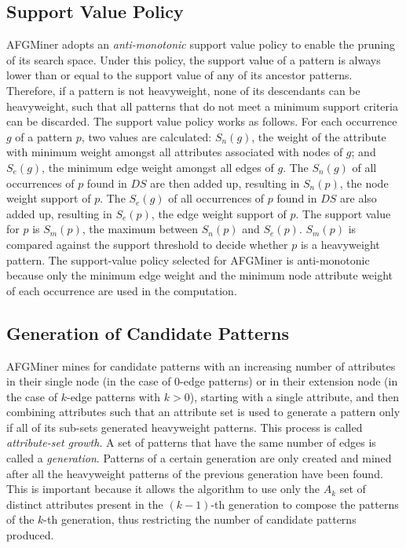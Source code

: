 \subsection{Support Value Policy}
AFGMiner adopts an \emph{anti-monotonic} support value policy to enable the pruning of its search space. Under this policy, the support value of a pattern is always lower than or equal to the support value of any of its ancestor patterns. Therefore, if a pattern is not heavyweight, none of its descendants can be heavyweight, such that all patterns that do not meet a minimum support criteria can be discarded. The support value policy works as follows. For each occurrence $g$ of a pattern $p$, two values are calculated: $S_n(g)$, the weight of the attribute with minimum weight amongst all attributes associated with nodes of $g$; and $S_e(g)$, the minimum edge weight amongst all edges of $g$. The $S_n(g)$ of all occurrences of $p$ found in $DS$ are then added up, resulting in $S_n(p)$, the node weight support of $p$. The $S_e(g)$ of all occurrences of $p$ found in $DS$ are also added up, resulting in $S_e(p)$, the edge weight support of $p$. The support value for $p$ is $S_m(p)$, the maximum between $S_n(p)$ and $S_e(p)$. $S_m(p)$ is compared against the support threshold to decide whether $p$ is a heavyweight pattern. The support-value policy selected for AFGMiner is anti-monotonic because only the minimum edge weight and the minimum node attribute weight of each occurrence are used in the computation.

\subsection{Generation of Candidate Patterns}
AFGMiner mines for candidate patterns with an increasing number of attributes in their single node (in the case of 0-edge patterns) or in their extension node (in the case of $k$-edge patterns with $k > 0$), starting with a single attribute, and then combining attributes such that an attribute set is used to generate a pattern only if all of its sub-sets generated heavyweight patterns. This process is called \emph{attribute-set growth}. A set of patterns that have the same number of edges is called a \emph{generation}. Patterns of a certain generation are only created and mined after all the heavyweight patterns of the previous generation have been found. This is important because it allows the algorithm to use only the $A_k$ set of distinct attributes present in the $(k - 1)$-th generation to compose the patterns of the $k$-th generation, thus restricting the number of candidate patterns produced.


